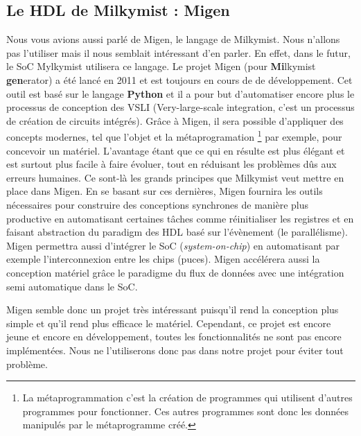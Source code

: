 \subsection{Le HDL de Milkymist : Migen}
Nous vous avions aussi parlé de Migen, le langage de Milkymist. Nous n'allons pas l'utiliser mais il nous semblait intéressant d'en parler. En effet, dans le futur, le SoC Mylkymist utilisera ce langage. Le projet Migen (pour \textbf{Mi}lkymist \textbf{gen}erator) a été lancé en 2011 et est toujours en cours de de développement. Cet outil est basé sur le langage \textbf{Python} et il a pour but d'automatiser encore plus le processus de conception des VSLI (Very-large-scale integration, c'est un processus de création de circuits intégrés). Grâce à Migen, il sera possible d'appliquer des concepts modernes, tel que l'objet et la métaprogramation \footnote{La métaprogrammation c'est la création de programmes qui utilisent d'autres programmes pour fonctionner. Ces autres programmes sont donc les données manipulés par le métaprogramme créé.}  par exemple, pour concevoir un matériel. L'avantage étant que ce qui en résulte est plus élégant et est surtout plus facile à faire évoluer, tout en réduisant les problèmes dûs aux erreurs humaines. Ce sont-là les grands principes que Milkymist veut mettre en place dans Migen. En se basant sur ces dernières, Migen fournira les outils nécessaires pour construire des conceptions synchrones de manière plus productive en automatisant certaines tâches comme réinitialiser les registres et en faisant abstraction du paradigm des HDL basé sur l'évènement (le parallélisme). Migen permettra aussi d'intégrer le SoC (\textit{system-on-chip}) en automatisant par exemple l'interconnexion entre les chips (puces). Migen accélérera aussi la conception matériel grâce le paradigme du flux de données avec une intégration semi automatique dans le SoC.
 
Migen semble donc un projet très intéressant puisqu'il rend la conception plus simple et qu'il rend plus efficace le matériel. Cependant, ce projet est encore jeune et encore en développement, toutes les fonctionnalités ne sont pas encore implémentées. Nous ne l'utiliserons donc pas dans notre projet pour éviter tout problème.
